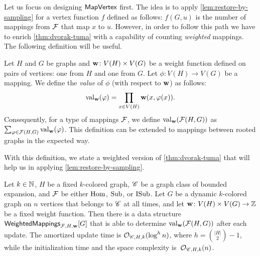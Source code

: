 Let us focus on designing $\mathsf{MapVertex}$ first. The idea  is to apply \cref{lem:restore-by-sampling} for a vertex function $f$ defined as follows: $f(G, u)$ is the number of mappings from $\mathcal{F}$ that map $x$ to $u$. However, in order to follow this path we have to enrich \cref{thm:dvorak-tuma} with a capability of counting \emph{weighted} mappings. The following definition will be useful.

\begin{definition} \label{def:mapping-value}
	Let $H$ and $G$ be graphs and $\mathbf{w}\colon V(H)\times V(G)$ be a weight function defined on pairs of vertices: one from $H$ and one from $G$. Let $\phi \colon V(H) \to V(G)$ be a mapping. We define the \textit{value} of $\phi$ (with respect to $\mathbf{w}$) as follows: \[\mathrm{val}_{\mathbf{w}}(\varphi) = \prod_{x \in V(H)} \mathbf{w}(x, \varphi(x)).\] Consequently, for a type of mappings $\mathcal{F}$, we define $\mathrm{val}_{\mathbf{w}}(\mathcal{F}(H, G))$ as $\sum_{\varphi \in \mathcal{F}(H, G)} \mathrm{val}_{\mathbf{w}}(\varphi)$. This definition can be extended to mappings between rooted graphs in the expected way.
\end{definition}

With this definition, we state a weighted version of \cref{thm:dvorak-tuma} that will help us in applying \cref{lem:restore-by-sampling}. 

\begin{theorem} \label{lem:weighted-dvorak}
	Let $k\in \mathbb{N}$, $H$ be a fixed $k$-colored graph, $\mathscr C$ be a graph class of bounded expansion, and $\mathcal{F}$ be either $\mathrm{Hom}$, $\mathrm{Sub}$, or $\mathrm{ISub}$. Let $G$ be a dynamic $k$-colored graph on $n$ vertices that belongs to $\mathscr C$ at all times, and let $\mathbf{w} \colon V(H) \times V(G) \to \mathbb{Z}$ be a fixed weight function. Then there is a data structure $\mathsf{WeightedMappings}_{\mathcal{F}, H, \mathbf{w}}[G]$ that is able to determine $\mathrm{val}_{\mathbf{w}}(\mathcal{F}(H, G))$ after each update. The amortized update time is $\mathcal{O}_{\mathscr C, H, k}(\log^h n)$, where $h = {|H| \choose 2} - 1$, while the initialization time and the space complexity is~$\mathcal{O}_{\mathscr C, H, k}(n)$. %
\end{theorem}

